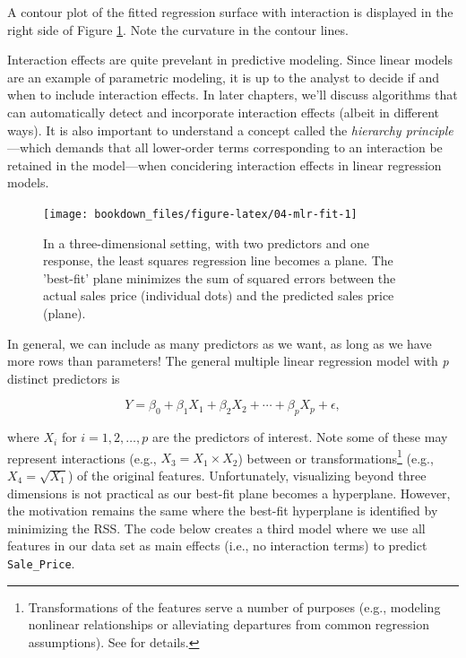 \documentclass[]{krantz}
\makeatletter
\newenvironment{kframe}{%
\medskip{}
\setlength{\fboxsep}{.8em}
 \def\at@end@of@kframe{}%
 \ifinner\ifhmode%
  \def\at@end@of@kframe{\end{minipage}}%
  \begin{minipage}{\columnwidth}%
 \fi\fi%
 \def\FrameCommand##1{\hskip\@totalleftmargin \hskip-\fboxsep
 \colorbox{shadecolor}{##1}\hskip-\fboxsep
     \hskip-\linewidth \hskip-\@totalleftmargin \hskip\columnwidth}%
 \MakeFramed {\advance\hsize-\width
   \@totalleftmargin\z@ \linewidth\hsize
   \@setminipage}}%
 {\par\unskip\endMakeFramed%
 \at@end@of@kframe}
\newenvironment{block}[1]
  {
  \begin{itemize}
  \renewcommand{\labelitemi}{
    \raisebox{-.7\height}[0pt][0pt]{
      {\setkeys{Gin}{width=3em,keepaspectratio}\texttt{[image: icons/\#1]}}
    }
  }
  \setlength{\fboxsep}{1em}
  \begin{kframe}
  \item
  }
  {
  \end{kframe}
  \end{itemize}
  }
\newenvironment{note}
  {\begin{block}{note}}
  {\end{block}}
\makeatother
\begin{document}
A contour plot of the fitted regression surface with interaction is displayed in the right side of Figure \ref{fig:04-mlr-fit}. Note the curvature in the contour lines.

\begin{note}
Interaction effects are quite prevelant in predictive modeling. Since
linear models are an example of parametric modeling, it is up to the
analyst to decide if and when to include interaction effects. In later
chapters, we'll discuss algorithms that can automatically detect and
incorporate interaction effects (albeit in different ways). It is also
important to understand a concept called the \emph{hierarchy
principle}---which demands that all lower-order terms corresponding to
an interaction be retained in the model---when concidering interaction
effects in linear regression models.
\end{note}

\begin{figure}

{\centering \texttt{[image: bookdown\_files/figure-latex/04-mlr-fit-1]} 

}

\caption{In a three-dimensional setting, with two predictors and one response, the least squares regression line becomes a plane. The 'best-fit' plane minimizes the sum of squared errors between the actual sales price (individual dots) and the predicted sales price (plane).}\label{fig:04-mlr-fit}
\end{figure}

In general, we can include as many predictors as we want, as long as we have more rows than parameters! The general multiple linear regression model with \emph{p} distinct predictors is

\begin{equation}
  Y = \beta_0 + \beta_1 X_1 + \beta_2 X_2 + \cdots + \beta_p X_p + \epsilon,
\end{equation}

where \(X_i\) for \(i = 1, 2, \dots, p\) are the predictors of interest. Note some of these may represent interactions (e.g., \(X_3 = X_1 \times X_2\)) between or transformations\footnote{Transformations of the features serve a number of purposes (e.g., modeling nonlinear relationships or alleviating departures from common regression assumptions). See \citet{kutner-2005-applied} for details.} (e.g., \(X_4 = \sqrt{X_1}\)) of the original features. Unfortunately, visualizing beyond three dimensions is not practical as our best-fit plane becomes a hyperplane. However, the motivation remains the same where the best-fit hyperplane is identified by minimizing the RSS. The code below creates a third model where we use all features in our data set as main effects (i.e., no interaction terms) to predict \texttt{Sale\_Price}.
\end{document}
